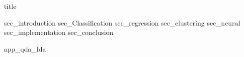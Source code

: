 \documentclass[12pt, a4paper]{article}
\begin{document}
{title}
\newpage
\tableofcontents
\newpage
\listoffigures
{sec_introduction}
{sec_Classification}
{sec_regression}
{sec_clustering}
{sec_neural}
{sec_implementation}
{sec_conclusion}
\newpage


\appendix
{app_qda_lda}
\end{document}
